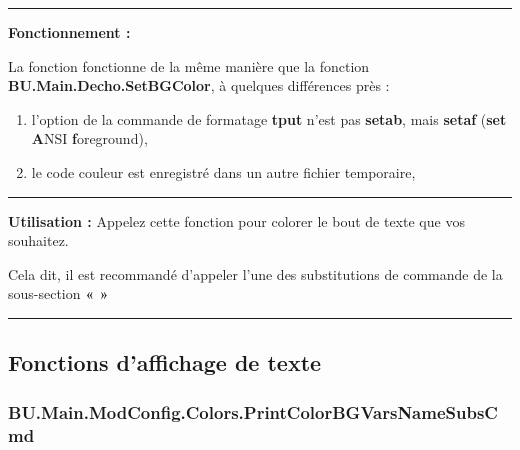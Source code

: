 \documentclass[a4paper,10pt]{article}
\begin{document}

\par\noindent\rule{\textwidth}{0.4pt}

\begin{justify}
    \textbf{Fonctionnement :}

    La fonction fonctionne de la même manière que la fonction \textbf{\color{func}BU.Main.Decho.SetBGColor}, à quelques différences près :
    \begin{enumerate}
        \item l'option de la commande de formatage \textbf{\color{cmds}tput} n'est pas \textbf{setab}, mais \textbf{setaf} (\textbf{set} \textbf{A}NSI \textbf{f}oreground),
        \item le code couleur est enregistré dans un autre fichier temporaire,
    \end{enumerate}
\end{justify}




\par\noindent\rule{\textwidth}{0.4pt}

\begin{justify}
    \textbf{Utilisation :} Appelez cette fonction pour colorer le bout de texte que vos souhaitez.
\end{justify}

\begin{justify}
    Cela dit, il est recommandé d'appeler l'une des substitutions de commande de la sous-section \textbf{\color{sec2}«  »}
\end{justify}







\color{sec2}\par\noindent\rule{\textwidth}{0.4pt}\color{text}

\color{sec2}
\subsection{Fonctions d'affichage de texte}\color{text}

\color{sec3}
\subsubsection{BU.Main.ModConfig.Colors.PrintColorBGVarsNameSubsCmd}\color{text}
\end{document}
